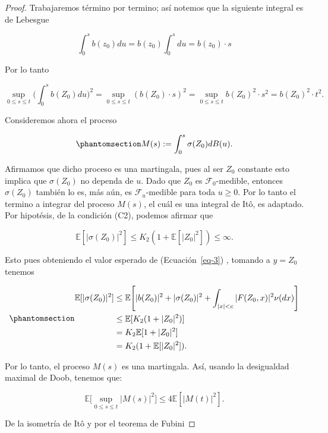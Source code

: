 \documentclass[
  spanish,
  us-letterpaper,
]{scrreprt}
\theoremstyle{plain}
\theoremstyle{plain}
\theoremstyle{definition}
\theoremstyle{plain}
\theoremstyle{remark}
\begin{document}
\begin{proof}
Trabajaremos término por termino; así notemos que la siguiente integral
es de Lebesgue

\[
    \int_0^s b(z_0)du = b(z_0) \int_0^s du = b(z_0)\cdot s
\]

Por lo tanto

\[
    \sup\limits_{0\leq s\leq t}\Bigg(\int_0^s b(Z_0)du\Bigg)^2=\sup\limits_{0\leq s\leq t}(b(Z_0)\cdot s)^2=\sup\limits_{0\leq s\leq t} b(Z_0)^2\cdot s^2= b(Z_0)^2\cdot t^2.
\]

Consideremos ahora el proceso

\begin{equation}\phantomsection\label{eq-mart}{
    M(s):=\int_0^s \sigma(Z_0)dB(u).
}\end{equation}

Afirmamos que dicho proceso es una martingala, pues al ser \(Z_0\)
constante esto implica que \(\sigma(Z_0)\) no dependa de \(u\). Dado que
\(Z_0\) es \(\mathcal{F}_0\text{-medible}\), entonces \(\sigma(Z_0)\)
también lo es, más aún, es \(\mathcal{F}_u\text{-medible}\) para toda
\(u\geq 0\). Por lo tanto el termino a integrar del proceso \(M(s)\), el
cuál es una integral de Itô, es adaptado. Por hipotésis, de la condición
(C2), podemos afirmar que

\[
        \mathbb{E}[|\sigma(Z_0)|^2] \leq K_2(1+\mathbb{E}[|Z_0|^2])\leq \infty.
\]

Esto pues obteniendo el valor esperado de (Ecuación~\ref{eq-3}) ,
tomando a \(y=Z_0\) tenemos

\begin{equation}\phantomsection\label{eq-6}{
    \begin{aligned}
        \mathbb{E}[|\sigma(Z_0)|^2] & \leq \mathbb{E}\Bigg[|b(Z_0)|^2+|\sigma(Z_0)|^2+\int_{|x|<c} |F(Z_0,x)|^2 \nu(dx)\Bigg]\\ 
        & \leq \mathbb{E}[K_2(1+|Z_0|^2)]\\ 
        & = K_2\mathbb{E}[1+|Z_0|^2]\\ 
        & = K_2 (1+\mathbb{E}[|Z_0|^2]).
    \end{aligned}
}\end{equation}

Por lo tanto, el proceso \(M(s)\) es una martingala. Así, usando la
desigualdad maximal de Doob, tenemos que:

\[
    \mathbb{E}\Bigg[\sup\limits_{0\leq s\leq t}|M(s)|^2\Bigg]\leq 4\mathbb{E}[|M(t)|^2].
\]

De la isometría de Itô y por el teorema de Fubini


\end{proof}
\end{document}
